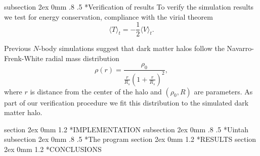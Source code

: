 \documentclass[notitlepage, 12pt]{article}
\makeatletter
\renewcommand{\section}{\@startsection       %
        {section}
        {2ex}
        {0mm}
        {1.2\baselineskip}
        {\baselineskip}
        {\centering\normalsize}}
\renewcommand{\subsection}{\@startsection    %
        {subsection}
        {2ex}
        {0mm}
        {.8\baselineskip}
        {.5\baselineskip}
        {\bfseries\normalsize}}
\makeatother
\begin{document}
\subsection*{Verification of results}
To verify the simulation results we test for energy conservation, compliance with the virial theorem 
\begin{equation}
\langle T \rangle_t = -\frac{1}{2}\langle V \rangle_t.
\end{equation}

Previous $N$-body simulations suggest that dark matter halos follow the Navarro-Frenk-White radial mass distribution 
\begin{equation}
\rho(r) = \frac{\rho_0}{\frac{r}{R_s}\left(1 + \frac{r}{R_s}\right)^2},
\end{equation}
where $r$ is distance from the center of the halo and $(\rho_0,R)$ are parameters. As part of our verification procedure we fit this distribution to the simulated dark matter halo.

\section*{IMPLEMENTATION}
\subsection*{Uintah}
\subsection*{The program}
\section*{RESULTS}
\section*{CONCLUSIONS}

%
\end{document}
